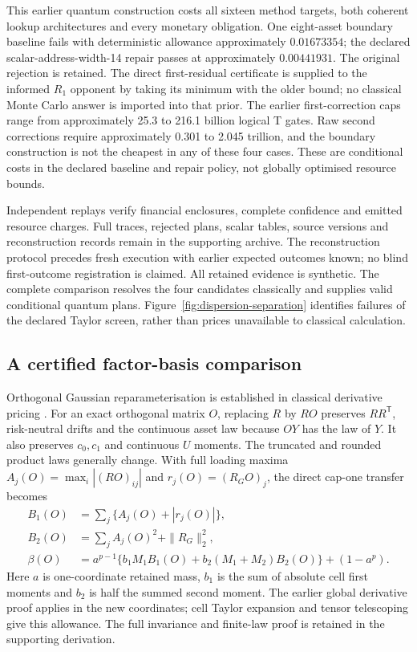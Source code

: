 \documentclass[11pt]{article}
\begin{document}
This earlier quantum construction costs all sixteen method targets, both
coherent lookup architectures and every monetary obligation. One eight-asset boundary
baseline fails with deterministic allowance approximately $0.01673354$;
the declared scalar-address-width-14 repair passes at approximately
$0.00441931$. The original rejection is retained. The direct first-residual
certificate is supplied to the informed $R_1$ opponent by taking its minimum
with the older bound; no classical Monte Carlo answer is imported into that
prior. The earlier first-correction caps range from approximately 25.3 to
216.1 billion logical T gates. Raw second corrections require approximately
0.301 to 2.045 trillion, and the boundary construction is not the cheapest
in any of these four cases. These are conditional costs in the declared
baseline and repair policy, not globally optimised resource bounds.

Independent replays verify financial enclosures, complete confidence and
emitted resource charges. Full traces, rejected plans, scalar tables,
source versions and reconstruction records remain in the supporting
archive. The reconstruction protocol precedes fresh execution with earlier
expected outcomes known; no blind first-outcome registration is claimed.
All retained evidence is synthetic. The complete comparison resolves the
four candidates classically and supplies valid conditional quantum plans.
Figure~\ref{fig:dispersion-separation} identifies failures of the declared
Taylor screen, rather than prices unavailable to classical calculation.

\subsection{A certified factor-basis comparison}
\label{sec:factor-basis}

Orthogonal Gaussian reparameterisation is established in classical
derivative pricing \citep{imai2006}. For an exact orthogonal matrix $O$,
replacing $R$ by $RO$ preserves $RR^{\mathsf T}$, risk-neutral drifts and
the continuous asset law because $OY$ has the law of $Y$. It also preserves
$c_0,c_1$ and continuous $U$ moments. The truncated and rounded product
laws generally change. With full loading maxima $A_j(O)=\max_i|(RO)_{ij}|$
and $r_j(O)=(R_G O)_j$, the direct cap-one transfer becomes
\begin{align}
B_1(O)&=\sum_j\{A_j(O)+|r_j(O)|\},\\
B_2(O)&=\sum_j A_j(O)^2+\|R_G\|_2^2,\\
\beta(O)&=a^{p-1}\{b_1M_1B_1(O)+b_2(M_1+M_2)B_2(O)\}+(1-a^p).
\end{align}
Here $a$ is one-coordinate retained mass, $b_1$ is the sum of absolute
cell first moments and $b_2$ is half the summed second moment. The earlier
global derivative proof applies in the new coordinates; cell Taylor
expansion and tensor telescoping give this allowance. The full invariance
and finite-law proof is retained in the supporting derivation.
\end{document}
